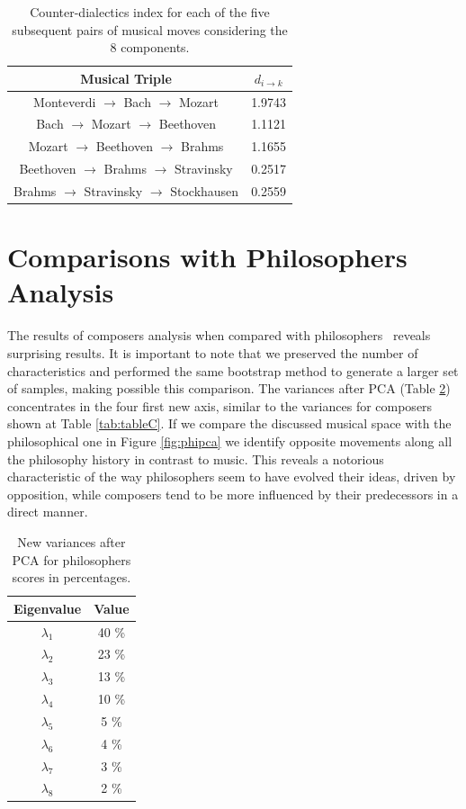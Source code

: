 \documentclass[
 aip,
 jmp,
 amsmath,amssymb,
 reprint,
]{revtex4-1}
\begin{document}
\begin{table}[ht]
\caption{\label{tab:tableE} Counter-dialectics index for each
of the five subsequent pairs of musical moves considering the 8 components.}

\begin{tabular}{|c||c|}
\hline
Musical Triple & $d_{i \rightarrow k}$ \\
\hline \hline

 Monteverdi $\to$ Bach $\to$ Mozart          & 1.9743 \\
 Bach $\to$ Mozart $\to$ Beethoven           & 1.1121 \\
 Mozart $\to$ Beethoven $\to$ Brahms         & 1.1655 \\
 Beethoven $\to$ Brahms $\to$ Stravinsky     & 0.2517 \\
 Brahms $\to$ Stravinsky $\to$ Stockhausen   & 0.2559 \\

\hline
\end{tabular}
\end{table}

\section{Comparisons with Philosophers Analysis}

The results of composers analysis when compared with philosophers~\cite{Fabbri}
reveals surprising results. It is important to note that we preserved the
number of characteristics and performed the same bootstrap method to
generate a larger set of samples, making possible this
comparison. The variances after PCA (Table \ref{tab:varphi}) concentrates in the four
first new axis, similar to the variances for composers shown at Table \ref{tab:tableC}. If we compare the discussed musical space
with the philosophical one in Figure \ref{fig:phipca} we
identify opposite movements along all the philosophy history in contrast
to music. This reveals a notorious characteristic of the way
philosophers seem to have evolved their ideas, driven by opposition, while
composers tend to be more influenced by their predecessors in a direct manner.

\begin{table}[ht]
\caption{\label{tab:varphi}New variances after PCA for philosophers
  scores in percentages.}

\begin{tabular}{|c||c|}
\hline
Eigenvalue  & Value     \\ \hline

$\lambda_1$ &  40 \% \\
$\lambda_2$ &  23 \% \\
$\lambda_3$ &  13 \% \\
$\lambda_4$ &  10 \% \\
$\lambda_5$ &   5 \% \\
$\lambda_6$ &   4 \% \\
$\lambda_7$ &   3 \% \\
$\lambda_8$ &   2 \% \\
\hline

\end{tabular}
\end{table}
\end{document}
